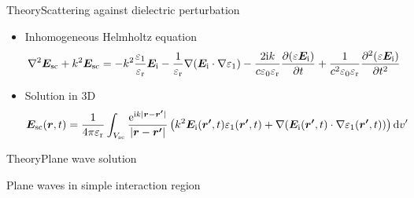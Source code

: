 \documentclass[11pt, final]{beamer}
\begin{document}
	\begin{frame}{Theory}{Scattering against dielectric perturbation}
		\begin{itemize}
			\item Inhomogeneous Helmholtz equation
			\footnotesize
			\begin{equation*}
				\nabla^2\bm{E}_{\mathrm{sc}} + k^2 \bm{E}_{\mathrm{sc}} =	-k^2 \frac{\varepsilon_1}{\varepsilon_{\mathrm{r}}} \bm{E}_{\mathrm{i}} -\frac{1}{\varepsilon_{\mathrm{r}}}\nabla(\bm{E}_{\mathrm{i}} \cdot \nabla \varepsilon_1) - \frac{2\mathrm{i} k}{c\varepsilon_0\varepsilon_{\mathrm{r}}} \frac{\partial (\varepsilon \bm{E}_{\mathrm{i}})}{\partial t} + \frac{1}{c^2 \varepsilon_0 \varepsilon_{\mathrm{r}}} \frac{\partial^2 (\varepsilon \bm{E}_{\mathrm{i}})}{\partial t^2}
			\end{equation*}
			\pause
			\normalsize
			\item Solution in 3D
			\footnotesize
			\begin{equation*}
				\bm{E}_{\mathrm{sc}}(\bm{r},t) = \frac{1}{4\pi\varepsilon_{\mathrm{r}}} \int_{V_{\mathrm{sc}}} \frac{\mathrm{e}^{\mathrm{i} k |\bm{r}-\bm{r'}| }}{ |\bm{r}-\bm{r'}|} \left( k^2 \bm{E}_{\mathrm{i}} (\bm{r'},t) \varepsilon_1 (\bm{r'},t) + \nabla (\bm{E}_{\mathrm{i}} (\bm{r'},t) \cdot \nabla \varepsilon_1 (\bm{r'},t)) \right) \mathrm{d}v'
			\end{equation*}
		\end{itemize}
	\end{frame}

	\begin{frame}{Theory}{Plane wave solution}
		\resizebox{!}{0.6\textheight}{
			
		}
		
	Plane waves in simple interaction region
	\end{frame}
	
\end{document}
